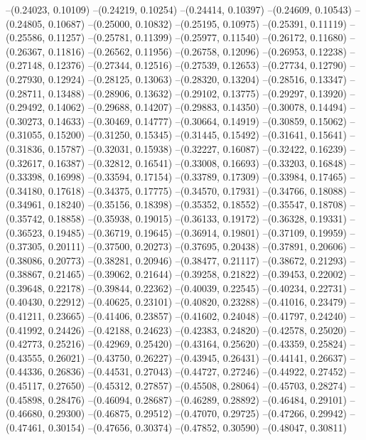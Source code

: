 --(0.24023, 0.10109)
--(0.24219, 0.10254)
--(0.24414, 0.10397)
--(0.24609, 0.10543)
--(0.24805, 0.10687)
--(0.25000, 0.10832)
--(0.25195, 0.10975)
--(0.25391, 0.11119)
--(0.25586, 0.11257)
--(0.25781, 0.11399)
--(0.25977, 0.11540)
--(0.26172, 0.11680)
--(0.26367, 0.11816)
--(0.26562, 0.11956)
--(0.26758, 0.12096)
--(0.26953, 0.12238)
--(0.27148, 0.12376)
--(0.27344, 0.12516)
--(0.27539, 0.12653)
--(0.27734, 0.12790)
--(0.27930, 0.12924)
--(0.28125, 0.13063)
--(0.28320, 0.13204)
--(0.28516, 0.13347)
--(0.28711, 0.13488)
--(0.28906, 0.13632)
--(0.29102, 0.13775)
--(0.29297, 0.13920)
--(0.29492, 0.14062)
--(0.29688, 0.14207)
--(0.29883, 0.14350)
--(0.30078, 0.14494)
--(0.30273, 0.14633)
--(0.30469, 0.14777)
--(0.30664, 0.14919)
--(0.30859, 0.15062)
--(0.31055, 0.15200)
--(0.31250, 0.15345)
--(0.31445, 0.15492)
--(0.31641, 0.15641)
--(0.31836, 0.15787)
--(0.32031, 0.15938)
--(0.32227, 0.16087)
--(0.32422, 0.16239)
--(0.32617, 0.16387)
--(0.32812, 0.16541)
--(0.33008, 0.16693)
--(0.33203, 0.16848)
--(0.33398, 0.16998)
--(0.33594, 0.17154)
--(0.33789, 0.17309)
--(0.33984, 0.17465)
--(0.34180, 0.17618)
--(0.34375, 0.17775)
--(0.34570, 0.17931)
--(0.34766, 0.18088)
--(0.34961, 0.18240)
--(0.35156, 0.18398)
--(0.35352, 0.18552)
--(0.35547, 0.18708)
--(0.35742, 0.18858)
--(0.35938, 0.19015)
--(0.36133, 0.19172)
--(0.36328, 0.19331)
--(0.36523, 0.19485)
--(0.36719, 0.19645)
--(0.36914, 0.19801)
--(0.37109, 0.19959)
--(0.37305, 0.20111)
--(0.37500, 0.20273)
--(0.37695, 0.20438)
--(0.37891, 0.20606)
--(0.38086, 0.20773)
--(0.38281, 0.20946)
--(0.38477, 0.21117)
--(0.38672, 0.21293)
--(0.38867, 0.21465)
--(0.39062, 0.21644)
--(0.39258, 0.21822)
--(0.39453, 0.22002)
--(0.39648, 0.22178)
--(0.39844, 0.22362)
--(0.40039, 0.22545)
--(0.40234, 0.22731)
--(0.40430, 0.22912)
--(0.40625, 0.23101)
--(0.40820, 0.23288)
--(0.41016, 0.23479)
--(0.41211, 0.23665)
--(0.41406, 0.23857)
--(0.41602, 0.24048)
--(0.41797, 0.24240)
--(0.41992, 0.24426)
--(0.42188, 0.24623)
--(0.42383, 0.24820)
--(0.42578, 0.25020)
--(0.42773, 0.25216)
--(0.42969, 0.25420)
--(0.43164, 0.25620)
--(0.43359, 0.25824)
--(0.43555, 0.26021)
--(0.43750, 0.26227)
--(0.43945, 0.26431)
--(0.44141, 0.26637)
--(0.44336, 0.26836)
--(0.44531, 0.27043)
--(0.44727, 0.27246)
--(0.44922, 0.27452)
--(0.45117, 0.27650)
--(0.45312, 0.27857)
--(0.45508, 0.28064)
--(0.45703, 0.28274)
--(0.45898, 0.28476)
--(0.46094, 0.28687)
--(0.46289, 0.28892)
--(0.46484, 0.29101)
--(0.46680, 0.29300)
--(0.46875, 0.29512)
--(0.47070, 0.29725)
--(0.47266, 0.29942)
--(0.47461, 0.30154)
--(0.47656, 0.30374)
--(0.47852, 0.30590)
--(0.48047, 0.30811)
